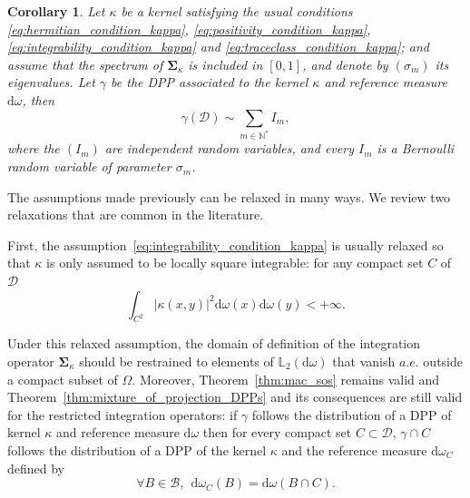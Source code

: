 \documentclass[twoside,11pt]{book}
\newtheorem{corollary}{Corollary}
\newtheorem{example}{Example}
\numberwithin{theorem}{chapter}
\numberwithin{definition}{chapter}
\numberwithin{proposition}{chapter}
\numberwithin{corollary}{chapter}
\numberwithin{example}{chapter}
\numberwithin{lemma}{chapter}
\numberwithin{assumption}{chapter}
\begin{document}
\begin{corollary}
Let $\kappa$ be a kernel satisfying the usual conditions \eqref{eq:hermitian_condition_kappa}, \eqref{eq:positivity_condition_kappa}, \eqref{eq:integrability_condition_kappa} and \eqref{eq:traceclass_condition_kappa}; and assume that the spectrum of $\bm{\Sigma}_{\kappa}$ is included in $[0,1]$, and denote by $(\sigma_{m})$ its eigenvalues. Let $\gamma$ be the DPP associated to the kernel $\kappa$ and reference measure $\mathrm{d}\omega$,
then 
\begin{equation}
\gamma(\mathcal{D}) \sim \sum\limits_{m \in \mathbb{N}^{*}} I_{m},
\end{equation}
where the $(I_m)$ are independent random variables, and every $I_m$ is a Bernoulli random variable of parameter $\sigma_m$.
\end{corollary}


The assumptions made previously can be relaxed in many ways. We review two relaxations that are common in the literature.

First, the assumption~\eqref{eq:integrability_condition_kappa} is usually relaxed so that $\kappa$ is only assumed to be locally square integrable: for any compact set $C$ of $\mathcal{D}$
\begin{equation}
\int_{C^{2}} |\kappa(x,y)|^{2} \mathrm{d}\omega(x) \mathrm{d}\omega(y) < +\infty.
\end{equation}

Under this relaxed assumption, the domain of definition of the integration operator $\bm{\Sigma}_{\kappa}$ should be restrained to elements of $\mathbb{L}_{2}(\mathrm{d}\omega)$ that vanish $a.e.$ outside a compact subset of $\Omega$. Moreover, Theorem~\ref{thm:mac_sos} remains valid and Theorem~\ref{thm:mixture_of_projection_DPPs} and its consequences are still valid for the restricted integration operators: if $\gamma$ follows the distribution of a DPP of kernel $\kappa$ and reference measure $\mathrm{d}\omega$ then for every compact set $C \subset \mathcal{D}$, $\gamma \cap C$ follows the distribution of a DPP of the kernel $\kappa$ and the reference measure $\mathrm{d}\omega_{C}$ defined by
\begin{equation}
\forall B \in \mathcal{B}, \:\: \mathrm{d}\omega_{C}(B) = \mathrm{d}\omega(B \cap C).
\end{equation}
\end{document}
